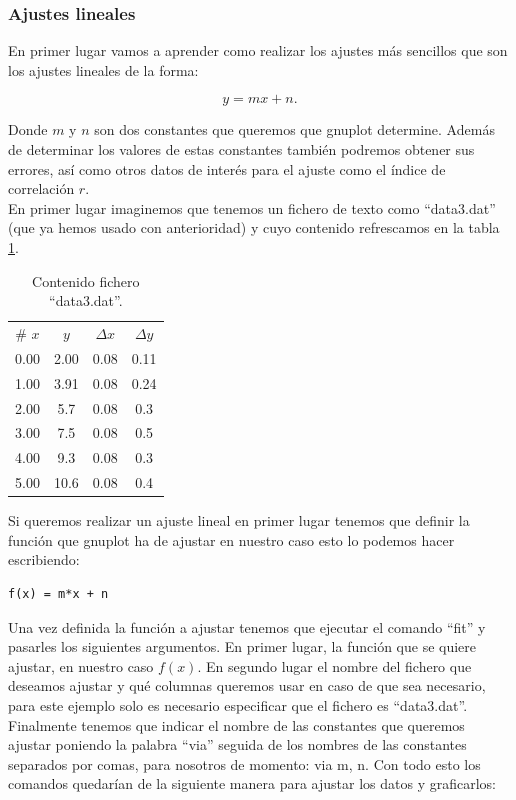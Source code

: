 \documentclass[11pt,a4paper,twoside,pdf]{article}
\numberwithin{equation}{section}
\begin{document}
\subsubsection{Ajustes lineales \label{subsubsec:ajusteslineales}}

En primer lugar vamos a aprender como realizar los ajustes más sencillos que son los ajustes lineales de la forma:

\[
y = mx + n
.\] 

Donde $m$ y $n$ son dos constantes que queremos que gnuplot determine. Además de determinar los valores de estas constantes también podremos obtener sus errores, así como otros datos de interés para el ajuste como el índice de correlación $r$.\\

En primer lugar imaginemos que tenemos un fichero de texto como ``data3.dat'' (que ya hemos usado con anterioridad) y cuyo contenido refrescamos en la tabla \ref{tab:data_plot_linfit}. \\

\begin{table}[h]
 \centering
 \caption{Contenido fichero ``data3.dat''.}
 \vspace{10pt}
 \label{tab:data_plot_linfit}
 \begin{tabular}{cccc}
  \# $x$ & $y$ & $\Delta x$ & $\Delta y$ \\
  0.00 & 2.00 & 0.08 & 0.11 \\
  1.00 & 3.91 & 0.08 & 0.24 \\
  2.00 & 5.7 & 0.08 & 0.3 \\
  3.00 & 7.5 & 0.08 & 0.5 \\
  4.00 & 9.3 & 0.08 & 0.3 \\
  5.00 & 10.6 & 0.08 & 0.4
 \end{tabular}
\end{table}

Si queremos realizar un ajuste lineal en primer lugar tenemos que definir la función que gnuplot ha de ajustar en nuestro caso esto lo podemos hacer escribiendo:

\begin{lstlisting}[language=Gnuplot]
f(x) = m*x + n
\end{lstlisting}

Una vez definida la función a ajustar tenemos que ejecutar el comando ``fit'' y pasarles los siguientes argumentos. En primer lugar, la función que se quiere ajustar, en nuestro caso $f(x)$. En segundo lugar el nombre del fichero que deseamos ajustar y qué columnas queremos usar en caso de que sea necesario, para este ejemplo solo es necesario especificar que el fichero es ``data3.dat''. Finalmente tenemos que indicar el nombre de las constantes que queremos ajustar poniendo la palabra ``via'' seguida de los nombres de las constantes separados por comas, para nosotros de momento: via m, n. Con todo esto los comandos quedarían de la siguiente manera para ajustar los datos y graficarlos:
\end{document}
